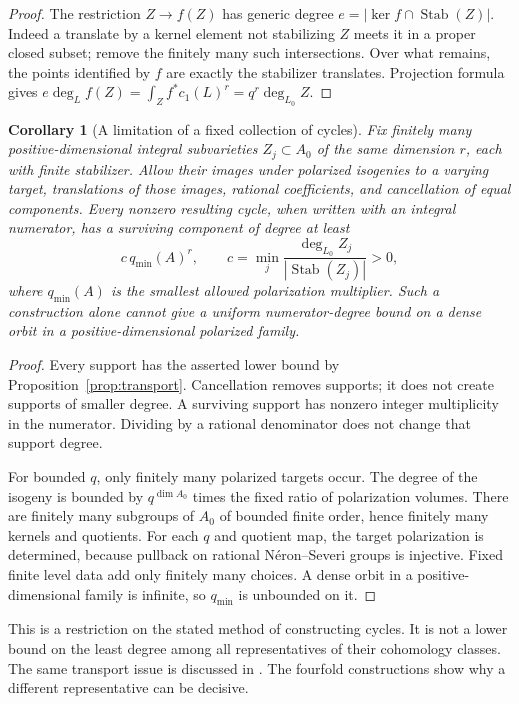 \documentclass[11pt]{article}
\newtheorem{corollary}[theorem]{Corollary}
\theoremstyle{definition}
\theoremstyle{remark}
\begin{document}
\begin{proof}
The restriction $Z\to f(Z)$ has generic degree
$e=|\ker f\cap\operatorname{Stab}(Z)|$. Indeed a translate by a kernel element not stabilizing $Z$ meets it in a proper closed subset; remove the finitely many such intersections. Over what remains, the points identified by $f$ are exactly the stabilizer translates. Projection formula gives
$e\deg_L f(Z)=\int_Zf^*c_1(L)^r=q^r\deg_{L_0}Z$.
\end{proof}

\begin{corollary}[A limitation of a fixed collection of cycles]\label{cor:fixed-catalog}
Fix finitely many positive-dimensional integral subvarieties $Z_j\subset A_0$ of the same dimension $r$, each with finite stabilizer. Allow their images under polarized isogenies to a varying target, translations of those images, rational coefficients, and cancellation of equal components. Every nonzero resulting cycle, when written with an integral numerator, has a surviving component of degree at least
\[
 c\,q_{\min}(A)^r,\qquad
 c=\min_j\frac{\deg_{L_0}Z_j}{|\operatorname{Stab}(Z_j)|}>0,
\]
where $q_{\min}(A)$ is the smallest allowed polarization multiplier. Such a construction alone cannot give a uniform numerator-degree bound on a dense orbit in a positive-dimensional polarized family.
\end{corollary}

\begin{proof}
Every support has the asserted lower bound by Proposition~\ref{prop:transport}. Cancellation removes supports; it does not create supports of smaller degree. A surviving support has nonzero integer multiplicity in the numerator. Dividing by a rational denominator does not change that support degree.

For bounded $q$, only finitely many polarized targets occur. The degree of the isogeny is bounded by $q^{\dim A_0}$ times the fixed ratio of polarization volumes. There are finitely many subgroups of $A_0$ of bounded finite order, hence finitely many kernels and quotients. For each $q$ and quotient map, the target polarization is determined, because pullback on rational N\'eron--Severi groups is injective. Fixed finite level data add only finitely many choices. A dense orbit in a positive-dimensional family is infinite, so $q_{\min}$ is unbounded on it.
\end{proof}

This is a restriction on the stated method of constructing cycles. It is not a lower bound on the least degree among all representatives of their cohomology classes. The same transport issue is discussed in \cite{BBAlgebraic}. The fourfold constructions show why a different representative can be decisive.
\end{document}
